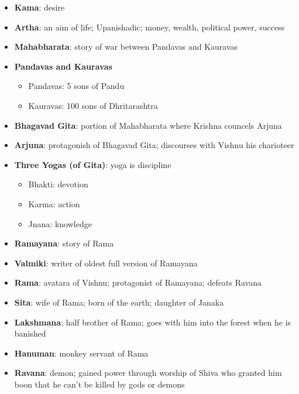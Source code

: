 \documentclass[11pt]{article} %
\begin{document}
\begin{itemize}
\item
{\bf Kama}: desire

\item
{\bf Artha}: an aim of life; Upanishadic; money, wealth, political power, success

\item
{\bf Mahabharata}: story of war between Pandavas and Kauravas

\item
{\bf Pandavas and Kauravas}
\begin{itemize}
\item Pandavas: 5 sons of Pandu
\item Kauravas: 100 sons of Dhritarashtra
\end{itemize}

\item
{\bf Bhagavad Gita}: portion of Mahabharata where Krishna councels Arjuna

\item
{\bf Arjuna}: protagonish of Bhagavad Gita; discourses with Vishnu his charioteer

\item
{\bf Three Yogas (of Gita)}: yoga is discipline
\begin{itemize}
\item Bhakti: devotion
\item Karma: action
\item Jnana: knowledge
\end{itemize}

\item
{\bf Ramayana}: story of Rama

\item
{\bf Valmiki}: writer of oldest full version of Ramayana

\item
{\bf Rama}: avatara of Vishnu; protagonist of Ramayana; defeats Ravana

\item
{\bf Sita}: wife of Rama; born of the earth; daughter of Janaka

\item
{\bf Lakshmana}: half brother of Rama; goes with him into the forest when he is banished

\item
{\bf Hanuman}: monkey servant of Rama

\item
{\bf Ravana}: demon; gained power through worship of Shiva who granted him boon that he can't be killed by gods or demons


\end{itemize}
\end{document}
